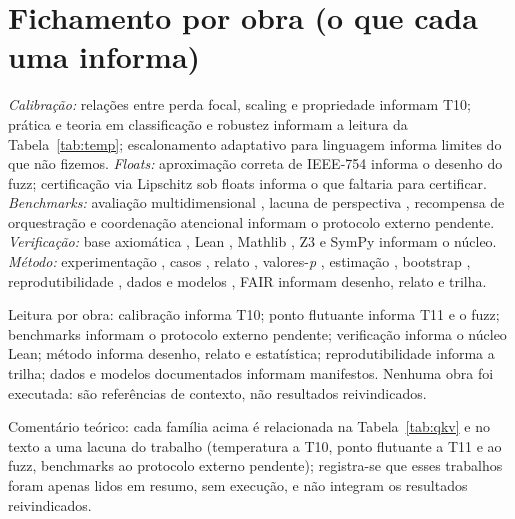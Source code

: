 \section{Fichamento por obra (o que cada uma informa)}
\textit{Calibração:} relações entre perda focal, scaling e propriedade \cite{komisarenko2024} informam T10; prática e teoria em classificação e robustez \cite{xuan2025} informam a leitura da Tabela~\ref{tab:temp}; escalonamento adaptativo para linguagem \cite{xie2024} informa limites do que não fizemos. \textit{Floats:} aproximação correta de IEEE-754 \cite{bagnara2019} informa o desenho do fuzz; certificação via Lipschitz sob floats \cite{murray2026} informa o que faltaria para certificar. \textit{Benchmarks:} avaliação multidimensional \cite{agentbench2023}, lacuna de perspectiva \cite{perspectivegap2026}, recompensa de orquestração \cite{orchrm2026} e coordenação atencional \cite{orchestrator2025} informam o protocolo externo pendente. \textit{Verificação:} base axiomática \cite{hoare1969}, Lean \cite{moura2021}, Mathlib \cite{mathlib2020}, Z3 \cite{demoura2008} e SymPy \cite{meurer2017} informam o núcleo. \textit{Método:} experimentação \cite{basili1986,wohlin2012}, casos \cite{runeson2009}, relato \cite{page2021}, valores-\textit{p} \cite{wasserstein2016}, estimação \cite{cumming2014}, bootstrap \cite{efron1979}, reprodutibilidade \cite{osc2015,collberg2016,ioannidis2005}, dados e modelos \cite{gebru2021,mitchell2019}, FAIR \cite{wilkinson2016} informam desenho, relato e trilha.
\par Leitura por obra: calibração informa T10; ponto flutuante informa T11 e o fuzz; benchmarks informam o protocolo externo pendente; verificação informa o núcleo Lean; método informa desenho, relato e estatística; reprodutibilidade informa a trilha; dados e modelos documentados informam manifestos. Nenhuma obra foi executada: são referências de contexto, não resultados reivindicados.
\par Comentário teórico: cada família acima é relacionada na Tabela~\ref{tab:qkv} e no texto a uma lacuna do trabalho (temperatura a T10, ponto flutuante a T11 e ao fuzz, benchmarks ao protocolo externo pendente); registra-se que esses trabalhos foram apenas lidos em resumo, sem execução, e não integram os resultados reivindicados.
